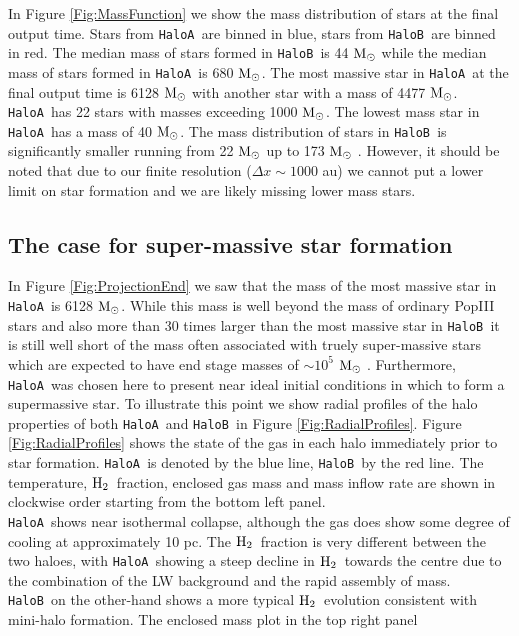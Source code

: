 \documentclass[graphics, twocolumn, usenatbib]{mn2e}
\newcommand{\msolar} {$\rm{M_{\odot}}~$}
\newcommand{\msolarc} {$\rm{M_{\odot}}$}
\newcommand{\molH} {$\rm{H_2}$~}
\newcommand{\ha} {\texttt{HaloA~}}
\newcommand{\hb} {\texttt{HaloB~}}
\begin{document}
\indent In Figure \ref{Fig:MassFunction} we show the mass distribution of stars at the final
output time. Stars from \ha are binned in blue, stars from \hb are binned in red. The median mass
of stars formed in \hb is 44 \msolar while the median mass of stars formed in \ha is 680 \msolarc.
The most massive star in \ha at the final output time is 6128 \msolar with another star with a mass
of 4477 \msolarc. \ha has 22 stars with masses exceeding 1000 \msolarc. The lowest mass star in
\ha has a mass of 40 \msolarc. The mass distribution of stars in \hb is significantly smaller running
from 22 \msolar up to 173 \msolar. However, it should be noted that due to our finite resolution
($\Delta x \sim 1000$ au) we cannot put a lower limit on star formation and we are likely missing lower mass stars. 

\subsection{The case for super-massive star formation}
In Figure \ref{Fig:ProjectionEnd} we saw that the mass of the most massive star in \ha is
6128 \msolarc. While this mass is well beyond the mass of ordinary PopIII stars \citep{Turk_2009, Greif_2011, Wise_2012b, Crosby_2013, Susa_2014, Hirano_2014, Stacy_2016} and also more than 30 times
larger than the most massive star in \hb it is still well short of the mass often associated with
truely super-massive stars \citep[e.g.][]{Woods_2018} which are expected to have
end stage masses of $\sim 10^5$ \msolar. Furthermore, \ha was chosen here to present near ideal initial conditions in which to form a supermassive star.
To illustrate this point we show radial profiles of the halo properties of both \ha and \hb in
Figure \ref{Fig:RadialProfiles}. Figure \ref{Fig:RadialProfiles} shows the state of the gas in each halo immediately prior to star formation. \ha is denoted by the blue line, \hb by the red line.
The temperature, \molH fraction, enclosed gas mass and mass inflow rate are shown in clockwise order starting from the bottom left panel. \\
\indent \ha shows near isothermal collapse, although the gas does
show some degree of cooling at approximately 10 pc. The \molH fraction is very different between
the two haloes, with \ha showing a steep decline in \molH towards the centre due to the combination
of the LW background and the rapid assembly of mass. \hb on the other-hand shows a more typical
\molH evolution consistent with mini-halo formation. The enclosed mass plot in the top right panel
\end{document}
